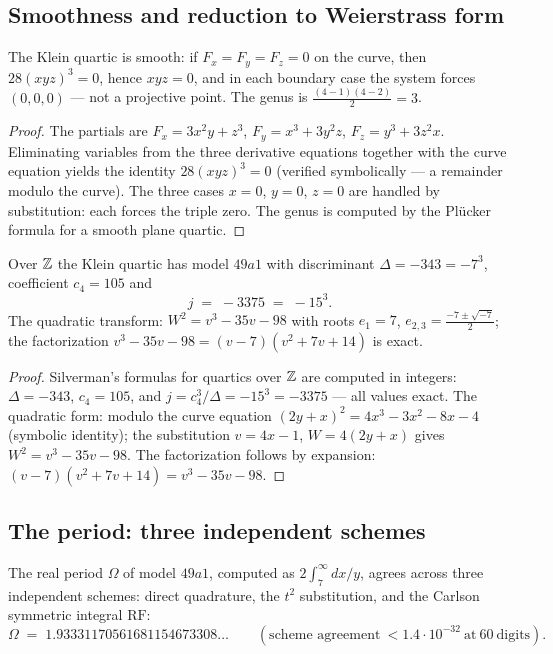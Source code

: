 \subsection{Smoothness and reduction to Weierstrass form}

\begin{proposition}\label{prop:klein-smooth}
The Klein quartic is smooth: if $F_x=F_y=F_z=0$ on the curve, then
$28(xyz)^3=0$, hence $xyz=0$, and in each boundary case the system
forces $(0,0,0)$ --- not a projective point. The genus is
$\tfrac{(4-1)(4-2)}{2}=3$.
\end{proposition}

\begin{proof}
The partials are $F_x=3x^2y+z^3$, $F_y=x^3+3y^2z$,
$F_z=y^3+3z^2x$. Eliminating variables from the three derivative
equations together with the curve equation yields the identity
$28(xyz)^3=0$ (verified symbolically --- a remainder modulo the
curve). The three cases $x=0$, $y=0$, $z=0$ are handled by
substitution: each forces the triple zero. The genus is computed by
the Pl\"ucker formula for a smooth plane quartic.
\end{proof}

\begin{proposition}
\label{prop:klein-49a1}
Over $\mathbb{Z}$ the Klein quartic has model $49a1$ with discriminant
$\Delta=-343=-7^3$, coefficient $c_4=105$ and
\[
  j \;=\; -3375 \;=\; -15^3 .
\]
The quadratic transform: $W^2=v^3-35v-98$ with roots $e_1=7$,
$e_{2,3}=\tfrac{-7\pm\sqrt{-7}}{2}$; the factorization
$v^3-35v-98=(v-7)(v^2+7v+14)$ is exact.
\end{proposition}

\begin{proof}
Silverman's formulas for quartics over $\mathbb{Z}$ are computed in
integers: $\Delta=-343$, $c_4=105$, and $j=c_4^3/\Delta
=-15^3=-3375$ --- all values exact. The quadratic form: modulo the
curve equation $(2y+x)^2=4x^3-3x^2-8x-4$ (symbolic identity); the
substitution $v=4x-1$, $W=4(2y+x)$ gives $W^2=v^3-35v-98$. The
factorization follows by expansion: $(v-7)(v^2+7v+14)=v^3-35v-98$.
\end{proof}

\subsection{The period: three independent schemes}

\begin{proposition}\label{prop:klein-period}
The real period $\Omega$ of model $49a1$, computed as
$2\int_7^\infty dx/y$, agrees across three independent schemes:
direct quadrature, the $t^2$ substitution, and the Carlson symmetric
integral $\mathrm{RF}$:
\[
  \Omega \;=\; 1.93331170561681154673308\ldots
  \qquad (\text{scheme agreement}\ <1.4\cdot10^{-32}\ \text{at}\ 60\
  \text{digits}).
\]
\end{proposition}

